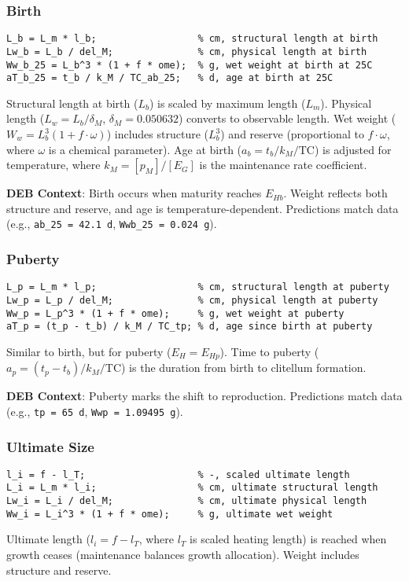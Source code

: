 \documentclass[11pt]{article}
\begin{document}
\subsubsection{Birth}
\begin{verbatim}
L_b = L_m * l_b;                  % cm, structural length at birth
Lw_b = L_b / del_M;               % cm, physical length at birth
Ww_b_25 = L_b^3 * (1 + f * ome);  % g, wet weight at birth at 25C
aT_b_25 = t_b / k_M / TC_ab_25;   % d, age at birth at 25C
\end{verbatim}
Structural length at birth ($L_b$) is scaled by maximum length ($L_m$). Physical length ($L_w = L_b / \delta_M$, $\delta_M = 0.050632$) converts to observable length. Wet weight ($W_w = L_b^3 (1 + f \cdot \omega)$) includes structure ($L_b^3$) and reserve (proportional to $f \cdot \omega$, where $\omega$ is a chemical parameter). Age at birth ($a_b = t_b / k_M / \text{TC}$) is adjusted for temperature, where $k_M = [p_M] / [E_G]$ is the maintenance rate coefficient.

\textbf{DEB Context}: Birth occurs when maturity reaches $E_{Hb}$. Weight reflects both structure and reserve, and age is temperature-dependent. Predictions match data (e.g., \texttt{ab\_25 = 42.1 d}, \texttt{Wwb\_25 = 0.024 g}).

\subsubsection{Puberty}
\begin{verbatim}
L_p = L_m * l_p;                  % cm, structural length at puberty
Lw_p = L_p / del_M;               % cm, physical length at puberty
Ww_p = L_p^3 * (1 + f * ome);     % g, wet weight at puberty
aT_p = (t_p - t_b) / k_M / TC_tp; % d, age since birth at puberty
\end{verbatim}
Similar to birth, but for puberty ($E_H = E_{Hp}$). Time to puberty ($a_p = (t_p - t_b) / k_M / \text{TC}$) is the duration from birth to clitellum formation.

\textbf{DEB Context}: Puberty marks the shift to reproduction. Predictions match data (e.g., \texttt{tp = 65 d}, \texttt{Wwp = 1.09495 g}).

\subsubsection{Ultimate Size}
\begin{verbatim}
l_i = f - l_T;                    % -, scaled ultimate length
L_i = L_m * l_i;                  % cm, ultimate structural length
Lw_i = L_i / del_M;               % cm, ultimate physical length
Ww_i = L_i^3 * (1 + f * ome);     % g, ultimate wet weight
\end{verbatim}
Ultimate length ($l_i = f - l_T$, where $l_T$ is scaled heating length) is reached when growth ceases (maintenance balances growth allocation). Weight includes structure and reserve.
\end{document}
